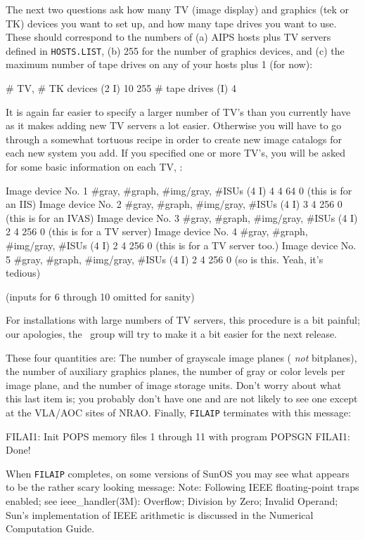 The next two questions ask how many TV (image display) and graphics (tek
or TK) devices you want to set up, and how many tape drives you want to
use.  These should correspond to the numbers of (a) AIPS hosts plus TV
servers defined in {\tt HOSTS.LIST}, (b) 255 for the number of graphics
devices, and (c) the maximum number of tape drives on any of your hosts
plus 1 (for now):
\medskip

\fortran
# TV, # TK devices (2 I)
10 255
# tape drives (I)
4
\endfortran

\medskip\noindent
It is again far easier to specify a larger number of TV's than you
currently have as it makes adding new TV servers a lot easier.
Otherwise you will have to go through a somewhat tortuous recipe in
order to create new image catalogs for each new system you add.
If you specified one or more TV's, you will be asked for some basic
information on each TV, \eg:\medskip

\fortran
Image device No. 1 #gray, #graph, #img/gray, #ISUs (4 I)
4 4 64 0                        (this is for an IIS)
Image device No. 2 #gray, #graph, #img/gray, #ISUs (4 I)
3 4 256 0                       (this is for an IVAS)
Image device No. 3 #gray, #graph, #img/gray, #ISUs (4 I)
2 4 256 0                       (this is for a TV server)
Image device No. 4 #gray, #graph, #img/gray, #ISUs (4 I)
2 4 256 0                       (this is for a TV server too.)
Image device No. 5 #gray, #graph, #img/gray, #ISUs (4 I)
2 4 256 0                       (so is this.  Yeah, it's tedious)

(inputs for 6 through 10 omitted for sanity)
\endfortran

\medskip\noindent For installations with large numbers of TV servers,
this procedure is a bit painful; our apologies, the \AIPS\ group will
try to make it a bit easier for the next release.

These four quantities are: The number of grayscale image planes ({\it
not\/} bitplanes), the number of auxiliary graphics planes, the number
of gray or color levels per image plane, and the number of image storage
units.  Don't worry about what this last item is; you probably don't
have one and are not likely to see one except at the VLA/AOC sites of
NRAO.  Finally, {\tt FILAIP} terminates with this message:
\medskip

\fortran
FILAI1: Init POPS memory files 1 through 11 with program POPSGN
FILAI1: Done!
\endfortran

\medskip\noindent
When {\tt FILAIP} completes, on some versions of SunOS you may see what
appears to be the rather scary looking message:
\medskip
\fortran
 Note: Following IEEE floating-point traps enabled; see ieee_handler(3M):
 Overflow;  Division by Zero;  Invalid Operand;
 Sun's implementation of IEEE arithmetic is discussed in
 the Numerical Computation Guide.
\endfortran
\medskip

